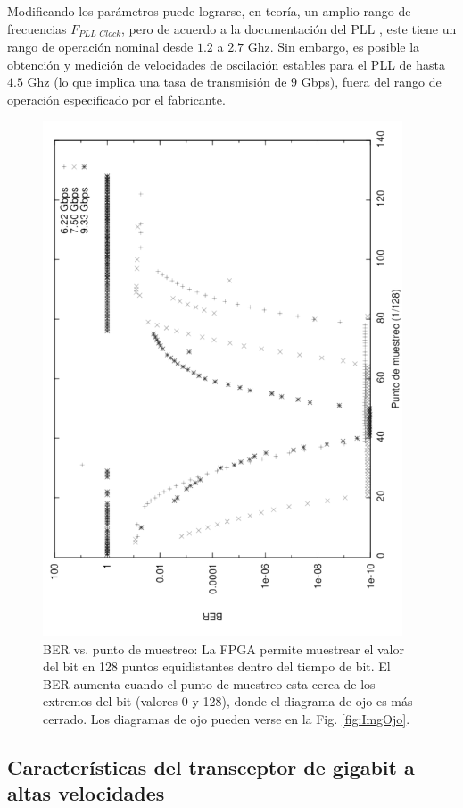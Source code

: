  Modificando los parámetros puede lograrse, en teoría, un amplio rango
de frecuencias $F_{PLL\_Clock}$, pero de acuerdo a la documentación
del PLL \cite[Pág. 71]{ug366}, este tiene un rango de operación nominal desde $1.2$ a
$2.7$ Ghz. Sin embargo, es posible \cite{OBGAH2010} la
obtención y medición de velocidades de oscilación estables para el PLL
de hasta $4.5$ Ghz (lo que implica una tasa de transmisión de $9$ Gbps),
fuera del rango de operación especificado por el fabricante.

\begin{figure}[t]
  \centering
    \includegraphics[width=4.2in,angle=270]{graphs/BER_sp_gray.pdf}
\caption {BER vs. punto de muestreo: La FPGA permite muestrear el valor del bit en 128 puntos equidistantes dentro del tiempo de bit. El BER aumenta cuando el punto de muestreo esta cerca de los extremos del bit (valores 0 y 128), donde el diagrama de ojo es más cerrado. Los diagramas de ojo pueden verse en la Fig. \ref{fig:ImgOjo}.}
\label{fig:BERvsSamplingPoint}
\end{figure}

\subsection{Características del transceptor de gigabit a altas velocidades}


